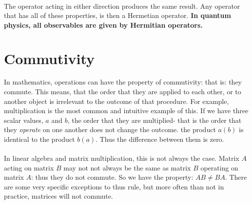 \documentclass[12pt,letterpaper]{book}
\begin{document}
\paragraph*{}The operator acting in either direction produces the same result. Any operator that has all of these properties, is then a Hermetian operator. \textbf{In quantum physics, all observables are given by Hermitian operators.}


\section{Commutivity}
\paragraph*{}In mathematics, operations can have the property of commutivity: that is: they commute. This means, that the order that they are applied to each other, or to another object is irrelevant to the outcome of that procedure. For example, multiplication is the most common and intuitive example of this. If we have three scalar values, $a$ and $b$, the order that they are multiplied- that is the order that they \textit{operate} on one another does not change the outcome. the product $a(b)$ is identical to the product $b(a)$. Thus the difference between them is zero.
\paragraph*{}In linear algebra and matrix multiplication, this is not always the case. Matrix $A$ acting on matrix $B$ may not not always be the same as matrix $B$ operating on matrix $A$: thus they do not commute. So we have the property: $AB \neq BA$. There are some very specific exceptions to thus rule, but more often than not in practice, matrices will not commute.
\end{document}
